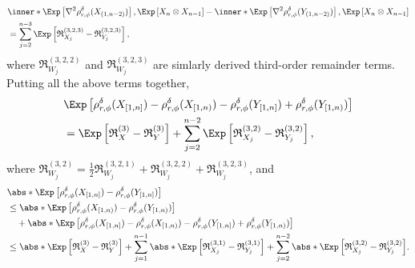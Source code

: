 \documentclass[aos]{imsart}
\begin{document}
\begin{appendix}
\begin{equation*}
\end{equation*}
\begin{equation*}
\begin{aligned}
    & \inner*{ 
        \Exp\left[ \nabla^2 \rho_{r,\phi}^\delta(X_{(1,n-2)}) \right], 
        \Exp\left[ X_n \otimes X_{n-1} \right]}
    - \inner*{ 
        \Exp\left[ \nabla^2 \rho_{r,\phi}^\delta(Y_{(1,n-2)}) \right], 
        \Exp\left[ X_n \otimes X_{n-1} \right]} \\
    & = \sum_{j=2}^{n-3} \Exp\left[ \mathfrak{R}_{X_j}^{(3,2,3)} - \mathfrak{R}_{Y_j}^{(3,2,3)} \right],
\end{aligned}
\end{equation*}
where $\mathfrak{R}_{W_j}^{(3,2,2)}$ and $\mathfrak{R}_{W_j}^{(3,2,3)}$ are simlarly derived third-order remainder terms.
Putting all the above terms together, 
\begin{equation*}
\begin{aligned}
    & \Exp\left[ \rho_{r,\phi}^{\delta}(X_{[1,n]}) - \rho_{r,\phi}^\delta(X_{[1,n)}) 
    - \rho_{r,\phi}^{\delta}(Y_{[1,n]}) + \rho_{r,\phi}^\delta(Y_{[1,n)}) \right] \\
    & = \Exp\left[ \mathfrak{R}_X^{(3)} - \mathfrak{R}_Y^{(3)} \right]
    + \sum_{j=2}^{n-2} \Exp\left[ \mathfrak{R}_{X_j}^{(3,2)} - \mathfrak{R}_{Y_j}^{(3,2)} \right],
\end{aligned}
\end{equation*}
where $\mathfrak{R}_{W_j}^{(3,2)} = \frac{1}{2} \mathfrak{R}_{W_j}^{(3,2,1)} + \mathfrak{R}_{W_j}^{(3,2,2)} + \mathfrak{R}_{W_j}^{(3,2,3)}$, and
\begin{equation} \label{eq:second_lindeberg_result_3P}
\begin{aligned}
    & \abs*{ \Exp\left[\rho_{r,\phi}^\delta(X_{[1,n]}) - \rho_{r,\phi}^\delta(Y_{[1,n]})\right]} \\
    & \leq \abs*{\Exp\left[\rho_{r,\phi}^\delta(X_{[1,n)}) - \rho_{r,\phi}^\delta(Y_{[1,n)})\right]} \\
    & \quad + \abs*{\Exp\left[\rho_{r,\phi}^{\delta}(X_{[1,n]}) - \rho_{r,\phi}^\delta(X_{[1,n)}) 
    - \rho_{r,\phi}^{\delta}(Y_{[1,n]}) + \rho_{r,\phi}^\delta(Y_{[1,n)})\right]} \\
    & \leq \abs*{\Exp\left[ \mathfrak{R}_X^{(3)} - \mathfrak{R}_Y^{(3)} \right]}
    + \sum_{j=1}^{n-1} \abs*{ \Exp \left[ 
        \mathfrak{R}_{X_j}^{(3,1)} 
        - \mathfrak{R}_{Y_j}^{(3,1)} 
    \right] }
    + \sum_{j=2}^{n-2} \abs*{ \Exp\left[ \mathfrak{R}_{X_j}^{(3,2)} - \mathfrak{R}_{Y_j}^{(3,2)} \right] }.
\end{aligned}
\end{equation}



\end{appendix}
\end{document}
